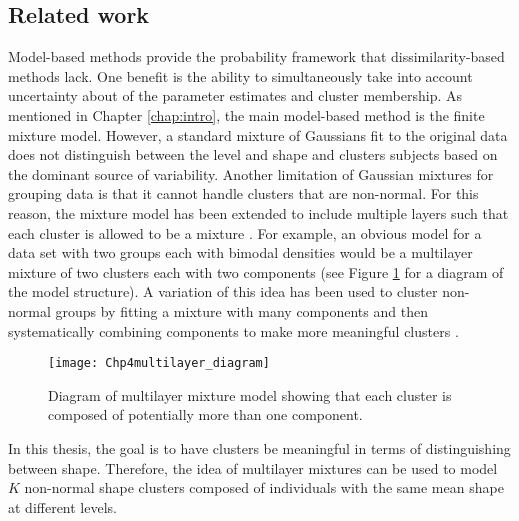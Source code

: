 \subsection{Related work}
Model-based methods provide the probability framework that dissimilarity-based methods lack. One benefit is the ability to simultaneously take into account uncertainty about of the parameter estimates and cluster membership. As mentioned in Chapter \ref{chap:intro}, the main model-based method is the finite mixture model. However, a standard mixture of Gaussians fit to the original data does not distinguish between the level and shape and clusters subjects based on the dominant source of variability. Another limitation of Gaussian mixtures for grouping data is that it cannot handle clusters that are non-normal. For this reason, the mixture model has been extended to include multiple layers such that each cluster is allowed to be a mixture \cite{li2005}.  For example, an obvious model for a data set with two groups each with bimodal densities would be a multilayer mixture of two clusters each with two components (see Figure \ref{fig:dia} for a diagram of the model structure). A variation of this idea has been used to cluster non-normal groups by fitting a mixture with many components and then systematically combining components to make more meaningful clusters \cite{hennig2010}. 
\begin{figure}[h]
\centering
\texttt{[image: Chp4multilayer\_diagram]}
\caption{Diagram of multilayer mixture model showing that each cluster is composed of potentially more than one component.}
\label{fig:dia}
\end{figure}

In this thesis, the goal is to have clusters be meaningful in terms of distinguishing between shape. Therefore, the idea of multilayer mixtures can be used to model $K$ non-normal shape clusters composed of individuals with the same mean shape at different levels.


